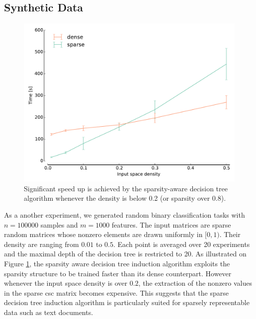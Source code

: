 \subsection{Synthetic Data}

\begin{figure}[!h]
\centering
\includegraphics[scale=0.45]{images/density.pdf}
\caption{Significant speed up is achieved by the sparsity-aware decision tree
         algorithm whenever the density is below 0.2 (or sparsity over 0.8).}
\label{fig:density}
\end{figure}

As a another experiment, we generated random binary classification tasks with
$n=100000$ samples and $m=1000$ features. The input matrices are sparse random
matrices whose nonzero elements are drawn uniformly in $[0, 1)$. Their density
are ranging from $0.01$ to $0.5$. Each point is averaged over 20 experiments
and the maximal depth of the decision tree is restricted to 20. As illustrated
on Figure \ref{fig:density}, the sparsity aware decision tree induction
algorithm exploits the sparsity structure to be trained faster than its dense
counterpart. However whenever the input space density is over $0.2$, the
extraction of the nonzero values in the sparse csc matrix becomes expensive.
This suggests that the sparse decision tree induction algorithm is particularly
suited for sparsely representable data such as text documents.






